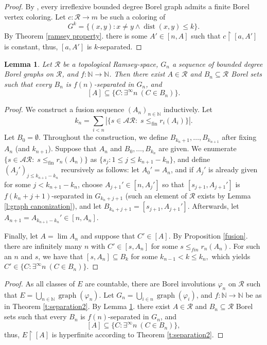 \documentclass[10pt,a4paper]{amsart}
\newcommand{\N}{\mathbb{N}}
\renewcommand{\restriction}[2]{#1 \upharpoonright #2}
\newtheorem{lemma}[theorem]{Lemma}
\theoremstyle{definition}
\DeclareMathOperator{\graph}{graph}
\DeclareMathOperator{\dist}{dist}
\newcommand{\rstr}{\restriction}
\newcommand{\vfi}{\varphi}
\newcommand{\sse}{\subseteq}
\newcommand{\est}{\emptyset}
\newcommand{\fA}{\mathcal{A}}
\newcommand{\fR}{\mathcal{R}}
\begin{document}
	\begin{proof}
		By \cite{KST}, every irreflexive bounded degree Borel graph admits a finite Borel vertex coloring. Let $c:\fR \to m$ be such a coloring of \[G^k=\{(x,y):x\neq y \wedge \dist(x,y)\le k \}.\] 
        By Theorem \ref{ramsey property}. there is some $A'\in[n,A]$ such that $\rstr{c}{[a,A']}$ is constant, thus, $[a,A']$ is $k$-separated. 
	\end{proof}
	
	
	\begin{lemma}\label{ramsey separation}
		Let $\fR$ be a topological Ramsey-space, $G_n$ a sequence of bounded degree Borel graphs on $\fR$, and $f:\N\to\N$. Then there exist $A\in\fR$ and $B_n\sse\fR$ Borel sets such that every $B_n$ is $f(n)$-separated in $G_n$, and 
		$$[A]\sse\{C:\exists^\infty n \ (C \in B_n)\}.$$
	\end{lemma}
	
	\begin{proof}
		We construct a fusion sequence $(A_n)_{n\in\N}$ inductively. Let 
		\[k_n=\sum_{i<n}|\{s\in\fA\fR: \; s\le_{\text{fin}}r_i(A_i)\} |.\]
		Let $B_0=\est.$ Throughout the construction, we define $B_{k_n+1}, \ldots, B_{k_{n+1}}$ after fixing $A_n$ (and  $k_{n+1}$).
		Suppose that $A_n$ and $B_0,\ldots, B_{k_n}$ are given. We enumerate $\{s\in\fA\fR: \; s\le_{\text{fin}}r_n(A_n)\}$ as $\{s_j: 1\le j\le k_{n+1}-k_n\}$, and define $(A_j')_{j\le k_{n+1}-k_n}$ recursively as follows: let $A_0'=A_n$, and if $A_j'$ is already given for some $j<k_{n+1}-k_n$, choose $A_{j+1}'\in [n,A_j']$ so that $[s_{j+1},A_{j+1}']$ is $f(k_n+j+1)$-separated in $G_{k_n+j+1}$ (such an element of $\fR$ exists by Lemma \ref{l:graph canonization}), and let $B_{k_n+j+1}=[s_{j+1},A_{j+1}']$. Afterwards, let $A_{n+1}=A_{k_{n+1}-k_n}'\in [n,A_n].$
		
		Finally, let $A=\lim A_n$ and suppose that $C'\in [A].$ By Proposition \ref{fusion}. there are infinitely many $n$ with $C'\in[s,A_n]$ for some $s\le_{fin}r_n(A_n)$. For such an $n$ and $s$, we have that $[s,A_n]\sse B_k$ for some $k_{n-1}<k\le k_n,$ which yields $C' \in\{C:\exists^\infty n \ (C \in B_n)\}$.
	\end{proof}

	\begin{proof}
		As all classes of $E$ are countable, there are Borel involutions $\vfi_n$ on $\fR$ such that $E=\bigcup_{n\in\N}\graph(\vfi_n)$. Let $G_n=\bigcup_{i\in n}\graph(\vfi_i)$, and $f:\N\to \N$ be as in Theorem \ref{t:separation2}. By Lemma \ref{ramsey separation}. there exist $A\in\fR$ and $B_n\sse\fR$ Borel sets such that every $B_n$ is $f(n)$-separated in $G_n$, and 
		$$[A]\sse\{C:\exists^\infty n \ (C \in B_n)\},$$
		thus, $\rstr{E}{[A]}$ is hyperfinite according to Theorem \ref{t:separation2}.
	\end{proof}



\end{document}
